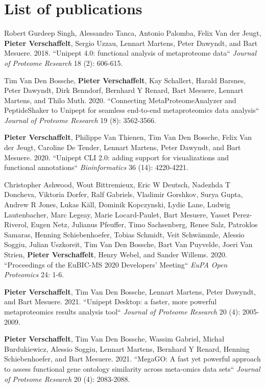 \chapter*{List of publications}

Robert Gurdeep Singh, Alessandro Tanca, Antonio Palomba, Felix Van der Jeugt, \textbf{Pieter Verschaffelt}, Sergio Uzzau, Lennart Martens, Peter Dawyndt, and Bart Mesuere. 2018. ``Unipept 4.0: functional analysis of metaproteome data`` \textit{Journal of Proteome Research} 18 (2): 606-615.

Tim Van Den Bossche, \textbf{Pieter Verschaffelt}, Kay Schallert, Harald Barsnes, Peter Dawyndt, Dirk Benndorf, Bernhard Y Renard, Bart Mesuere, Lennart Martens, and Thilo Muth. 2020. ``Connecting MetaProteomeAnalyzer and PeptideShaker to Unipept for seamless end-to-end metaproteomics data analysis`` \textit{Journal of Proteome Research} 19 (8): 3562-3566.

\textbf{Pieter Verschaffelt}, Philippe Van Thienen, Tim Van Den Bossche, Felix Van der Jeugt, Caroline De Tender, Lennart Martens, Peter Dawyndt, and Bart Mesuere. 2020. ``Unipept CLI 2.0: adding support for visualizations and functional annotations`` \textit{Bioinformatics} 36 (14): 4220-4221.

Christopher Ashwood, Wout Bittremieux, Eric W Deutsch, Nadezhda T Doncheva, Viktoria Dorfer, Ralf Gabriels, Vladimir Gorshkov, Surya Gupta, Andrew R Jones, Lukas Käll, Dominik Kopczynski, Lydie Lane, Ludwig Lautenbacher, Marc Legeay, Marie Locard-Paulet, Bart Mesuere, Yasset Perez-Riverol, Eugen Netz, Julianus Pfeuffer, Timo Sachsenberg, Renee Salz, Patroklos Samaras, Henning Schiebenhoefer, Tobias Schmidt, Veit Schwämmle, Alessio Soggiu, Julian Uszkoreit, Tim Van Den Bossche, Bart Van Puyvelde, Joeri Van Strien, \textbf{Pieter Verschaffelt}, Henry Webel, and Sander Willems. 2020. ``Proceedings of the EuBIC-MS 2020 Developers' Meeting`` \textit{EuPA Open Proteomics} 24: 1-6.

\textbf{Pieter Verschaffelt}, Tim Van Den Bossche, Lennart Martens, Peter Dawyndt, and Bart Mesuere. 2021. ``Unipept Desktop: a faster, more powerful metaproteomics results analysis tool`` \textit{Journal of Proteome Research} 20 (4): 2005-2009.

\textbf{Pieter Verschaffelt}, Tim Van Den Bossche, Wassim Gabriel, Michał Burdukiewicz, Alessio Soggiu, Lennart Martens, Bernhard Y Renard, Henning Schiebenhoefer, and Bart Mesuere. 2021. ``MegaGO: A fast yet powerful approach to assess functional gene ontology similarity across meta-omics data sets`` \textit{Journal of Proteome Research} 20 (4): 2083-2088.

